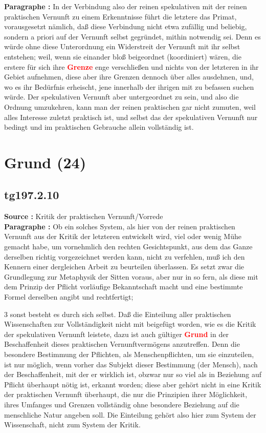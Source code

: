\documentclass[a4paper,12pt,twoside]{book}
\newcommand{\match}[1]{\textcolor{red}{\textbf{#1}}}
\newcommand{\unnumberedsection}[1]{
	\section*{#1}
	\addcontentsline{toc}{section}{#1}
	\markright{#1}
}
\begin{document}
	\noindent\textbf{Paragraphe : }In der Verbindung also der reinen spekulativen mit der reinen praktischen Vernunft zu einem Erkenntnisse führt die letztere das Primat, vorausgesetzt nämlich, daß diese Verbindung nicht etwa zufällig und beliebig, sondern a priori auf der Vernunft selbst gegründet, mithin notwendig sei. Denn es würde ohne diese Unterordnung ein Widerstreit der Vernunft mit ihr selbst entstehen; weil, wenn sie einander bloß beigeordnet (koordiniert) wären, die erstere für sich ihre \match{Grenze} enge verschließen und nichts von der  letzteren in ihr Gebiet aufnehmen, diese aber ihre Grenzen dennoch über alles ausdehnen, und, wo es ihr Bedürfnis erheischt, jene innerhalb der ihrigen mit zu befassen suchen würde. Der spekulativen Vernunft aber untergeordnet zu sein, und also die Ordnung umzukehren, kann man der reinen praktischen gar nicht zumuten, weil alles Interesse zuletzt praktisch ist, und selbst das der spekulativen Vernunft nur bedingt und im praktischen Gebrauche allein vollständig ist. 
	
	\unnumberedsection{Grund (24)} 
	\subsection*{tg197.2.10} 
	\textbf{Source : }Kritik der praktischen Vernunft/Vorrede\\  
	
	\noindent\textbf{Paragraphe : }Ob ein solches System, als hier von der reinen praktischen Vernunft aus der Kritik der letzteren entwickelt wird, viel oder wenig Mühe gemacht habe, um vornehmlich den rechten Gesichtspunkt, aus dem das Ganze derselben richtig vorgezeichnet werden kann, nicht zu verfehlen, muß ich den Kennern einer dergleichen Arbeit zu beurteilen überlassen. Es setzt zwar die Grundlegung zur Metaphysik der Sitten voraus, aber nur in so fern, als diese mit dem Prinzip der Pflicht vorläufige Bekanntschaft macht und eine bestimmte  Formel derselben angibt und rechtfertigt;
	
	
	3
	sonst besteht es durch sich selbst. Daß die Einteilung aller praktischen Wissenschaften zur Vollständigkeit nicht mit beigefügt worden, wie es die Kritik der spekulativen Vernunft leistete, dazu ist auch gültiger \match{Grund} in der Beschaffenheit dieses praktischen Vernunftvermögens anzutreffen. Denn die besondere Bestimmung der Pflichten, als Menschenpflichten, um sie einzuteilen, ist nur möglich, wenn vorher das Subjekt dieser Bestimmung (der Mensch), nach der Beschaffenheit, mit der er wirklich ist, obzwar nur so viel als in Beziehung auf Pflicht überhaupt nötig ist, erkannt worden; diese aber gehört nicht in eine Kritik der praktischen Vernunft überhaupt, die nur die Prinzipien ihrer Möglichkeit, ihres Umfanges und Grenzen vollständig ohne besondere Beziehung auf die menschliche Natur angeben soll. Die Einteilung gehört also hier zum System der Wissenschaft, nicht zum System der Kritik. 
	
\end{document}
